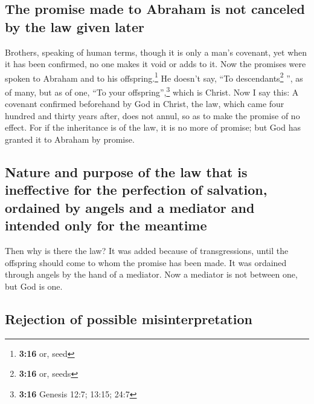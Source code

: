 \hypertarget{the-promise-made-to-abraham-is-not-canceled-by-the-law-given-later}{%
\subsection{The promise made to Abraham is not canceled by the law given
later}\label{the-promise-made-to-abraham-is-not-canceled-by-the-law-given-later}}

 Brothers, speaking of human terms, though it is only a
man's covenant, yet when it has been confirmed, no one makes it void or
adds to it.  Now the promises were spoken to Abraham and
to his offspring.\footnote{\textbf{3:16} or, seed} He doesn't say, ``To
descendants\footnote{\textbf{3:16} or, seeds} '', as of many, but as of
one, ``To your offspring'',\footnote{\textbf{3:16} Genesis 12:7; 13:15;
  24:7} which is Christ.  Now I say this: A covenant
confirmed beforehand by God in Christ, the law, which came four hundred
and thirty years after, does not annul, so as to make the promise of no
effect.  For if the inheritance is of the law, it is no
more of promise; but God has granted it to Abraham by promise.

\hypertarget{nature-and-purpose-of-the-law-that-is-ineffective-for-the-perfection-of-salvation-ordained-by-angels-and-a-mediator-and-intended-only-for-the-meantime}{%
\subsection{Nature and purpose of the law that is ineffective for the
perfection of salvation, ordained by angels and a mediator and intended
only for the
meantime}\label{nature-and-purpose-of-the-law-that-is-ineffective-for-the-perfection-of-salvation-ordained-by-angels-and-a-mediator-and-intended-only-for-the-meantime}}

 Then why is there the law? It was added because of
transgressions, until the offspring should come to whom the promise has
been made. It was ordained through angels by the hand of a mediator.
 Now a mediator is not between one, but God is one.

\hypertarget{rejection-of-possible-misinterpretation}{%
\subsection{Rejection of possible
misinterpretation}\label{rejection-of-possible-misinterpretation}}

